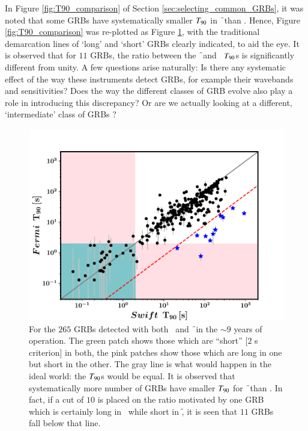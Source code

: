 In Figure \ref{fig:T90_comparison} of Section \ref{sec:selecting_common_GRBs}, it was noted that some GRBs have systematically smaller $\T$ in \f\ than \s. Hence, Figure \ref{fig:T90_comparison} was re-plotted as Figure \ref{fig:T90_vs_T90}, with the traditional demarcation lines of `long' and `short' GRBs clearly indicated, to aid the eye. It is observed that for $11$ GRBs, the ratio between the \f\ and \s\ $\T$s is significantly different from unity. A few questions arise naturally: Is there any systematic effect of the way these instruments detect GRBs, for example their wavebands and sensitivities? Does the way the different classes of GRB evolve also play a role in introducing this discrepancy? Or are we actually looking at a different, `intermediate' class of GRBs \citep{Horvath_&_Toth-2016-Ap&SS}? 

\begin{figure}
\begin{center}
\includegraphics[scale=0.5]{T90_vs_T90--all}
\caption[Detailed comparison of $\T$s of \f\ and \s\ GRBs]{For the $265$ GRBs detected with both \s\ and \f\ in the $\sim 9$ years of operation. The green patch shows those which are ``short'' [$2$ s criterion] in both, the pink patches show those which are long in one but short in the other. The gray line is what would happen in the ideal world: the $\T$s would be equal. It is observed that systematically more number of GRBs have smaller $\T$ for \f\ than \s. In fact, if a cut of $10$ is placed on the ratio motivated by one GRB which is certainly long in \s\ while short in \f, it is seen that $11$ GRBs fall below that line.}
\label{fig:T90_vs_T90}
\end{center}
\end{figure}

